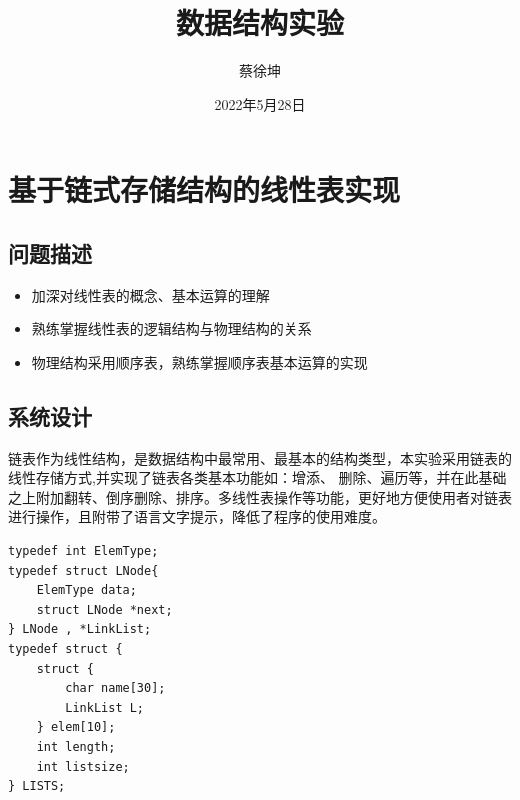 \documentclass[supercite]{Experimental_Report}
\title{~~~~~~数据结构实验~~~~~~}
\author{蔡徐坤}
\date{2022年5月28日}
\theoremstyle{definition}
\begin{document}
\maketitle

\clearpage


\tableofcontents[level=2]

\clearpage


\setlength{\parindent}{2em}

\lstset{language=C}



\section{基于链式存储结构的线性表实现}


\subsection{问题描述}

\begin{itemize}
	\item 加深对线性表的概念、基本运算的理解
	\item 熟练掌握线性表的逻辑结构与物理结构的关系
	\item 物理结构采用顺序表，熟练掌握顺序表基本运算的实现
\end{itemize}


\subsection{系统设计}

链表作为线性结构，是数据结构中最常用、最基本的结构类型，本实验采用链表的线性存储方式,并实现了链表各类基本功能如：增添、
删除、遍历等，并在此基础之上附加翻转、倒序删除、排序。多线性表操作等功能，更好地方便使用者对链表进行操作，且附带了语言文字提示，降低了程序的使用难度。
\begin{center}
	\label{lst-1}
\end{center}
\begin{lstlisting}	
typedef int ElemType;
typedef struct LNode{ 
  	ElemType data;
  	struct LNode *next;
} LNode , *LinkList;
typedef struct {     
 	struct { 
      	char name[30];
 		LinkList L;	
  	} elem[10];
 	int length;
  	int listsize;
} LISTS;
\end{lstlisting}
\end{document}
